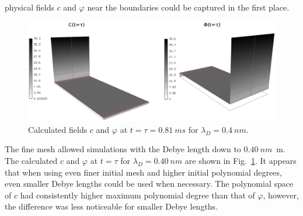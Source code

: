 physical fields $c$ and $\varphi$ near the boundaries could be captured in the first place.
\begin{figure}[!ht]
  \begin{centering}
  \includegraphics[width=\columnwidth]{cphitau}
  \caption{\label{fig:cphitau} Calculated fields $c$ and $\varphi$ at $t=\tau=0.81\ ms$
	for $\lambda_D=0.4\ nm$.}
  \end{centering}
\end{figure}
\noindent
The fine mesh allowed simulations with the Debye length down to $0.40\ nm$~m. The calculated
$c$ and $\varphi$ at $t=\tau$ for $\lambda_D=0.40\ nm$ are shown in Fig.~\ref{fig:cphitau}.
It appears that when using even finer initial mesh and higher initial polynomial degrees, even
smaller Debye lengths could be used when necessary. The polynomial space of $c$ had
consistently higher maximum polynomial degree than that of $\varphi$, however, the difference
was less noticeable for smaller Debye lengths.